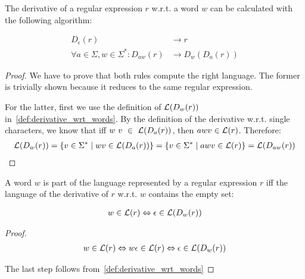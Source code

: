 \begin{theorem}
    The derivative of a regular expression $r$ w.r.t. a word $w$ can be calculated with the following algorithm:

    \begin{align}
        D_\epsilon(r) &\rightarrow r \\
        \forall a \in \Sigma, w \in \Sigma^\ast: D_{a w}(r) &\rightarrow D_w(D_a(r))
    \end{align}
\end{theorem}

\begin{proof}
    We have to prove that both rules compute the right language.
    The former is trivially shown because it reduces to the same regular expression.

    For the latter, first we use the definition of $\mathcal{L}(D_w(r))$ in~\ref{def:derivative_wrt_words}.
    By the definition of the derivative w.r.t. single characters,
    we know that iff $w~v~\in~\mathcal{L}(D_a(r))$, then $a w v \in \mathcal{L}(r)$.
    Therefore:
    \begin{align}
        \mathcal{L}(D_w(r))
        = \{ v \in \Sigma^\ast \mid w v \in \mathcal{L}(D_a(r)) \}
        = \{ v \in \Sigma^\ast \mid a w v \in \mathcal{L}(r) \}
        = \mathcal{L}(D_{a w}(r))
    \end{align}
\end{proof}

\begin{theorem}
    A word $w$ is part of the language represented by a regular expression $r$ iff
    the language of the derivative of $r$ w.r.t. $w$ contains the empty set:

    \begin{align}
        w \in \mathcal{L}(r) \Leftrightarrow \epsilon \in \mathcal{L}(D_w(r))
    \end{align}
\end{theorem}

\begin{proof}
    \begin{align}
        w \in \mathcal{L}(r) \Leftrightarrow w \epsilon \in \mathcal{L}(r) \Leftrightarrow \epsilon \in \mathcal{L}(D_w(r))
    \end{align}

    The last step follows from~\ref{def:derivative_wrt_words}
\end{proof}
